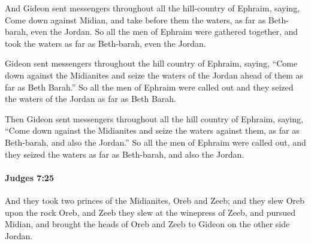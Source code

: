 			\begin{versebox}
					\item[BHS] 
					\item[ASV] And Gideon sent messengers throughout all the hill-country of Ephraim, saying, Come down against Midian, and take before them the waters, as far as Beth-barah, even the Jordan. So all the men of Ephraim were gathered together, and took the waters as far as Beth-barah, even the Jordan.
					\item[NIV] Gideon sent messengers throughout the hill country of Ephraim, saying, “Come down against the Midianites and seize the waters of the Jordan ahead of them as far as Beth Barah.” So all the men of Ephraim were called out and they seized the waters of the Jordan as far as Beth Barah.
					\item[NRSV] Then Gideon sent messengers throughout all the hill country of Ephraim, saying, “Come down against the Midianites and seize the waters against them, as far as Beth-barah, and also the Jordan.” So all the men of Ephraim were called out, and they seized the waters as far as Beth-barah, and also the Jordan.
			\end{versebox}

		\paragraph{Judges 7:25} %
			\label{JUDGES-7-25}

			And they took two princes of the Midianites, Oreb and Zeeb; and they slew Oreb upon the rock Oreb, and Zeeb they slew at the winepress of Zeeb, and pursued Midian, and brought the heads of Oreb and Zeeb to Gideon on the other side Jordan.

